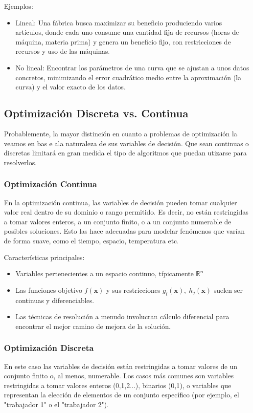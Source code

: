\documentclass[12pt,a4paper]{book}
\begin{document}
Ejemplos:
\begin{itemize}
    \item Lineal: Una fábrica busca maximizar su beneficio produciendo varios artículos, donde cada uno consume una cantidad fija de recursos (horas de máquina, materia prima) y genera un beneficio fijo, con restricciones de recursos y uso de las máquinas.
    \item No lineal: Encontrar los parámetros de una curva que se ajustan a unos datos concretos, minimizando el error cuadrático medio entre la aproximación (la curva) y el valor exacto de los datos.
\end{itemize}

\subsection{Optimización Discreta vs. Continua}
Probablemente, la mayor distinción en cuanto a problemas de optimización la veamos en bas e ala naturaleza de sus variables de decisión. Que sean continuas o discretas
limitará en gran medida el tipo de algoritmos que puedan utizarse para resolverlos.

\subsubsection{Optimización Continua}
En la optimización continua, las variables de decisión pueden tomar cualquier valor real dentro de su dominio o rango permitido. Es decir, no están restringidas a tomar valores enteros, a un conjunto finito, o a un conjunto numerable de posibles soluciones. Esto las hace adecuadas para modelar fenómenos que varían de forma suave, como el tiempo, espacio, temperatura etc.

Características principales:
\begin{itemize}
    \item Variables pertenecientes a un espacio continuo, típicamente $\mathbb{R}^n$
    \item Las funciones objetivo $f(\mathbf{x})$ y sus restricciones $g_i(\mathbf{x}), \;h_j(\mathbf{x})$ suelen ser continuas y diferenciables.
    \item Las técnicas de resolución a menudo involucran cálculo diferencial para encontrar el mejor camino de mejora de la solución.
\end{itemize}

\subsubsection{Optimización Discreta}
En este caso las variables de decisión están restringidas a tomar valores de un conjunto finito o, al menos, numerable. Los casos más comunes son variables restringidas a tomar valores enteros (0,1,2...), binarios (0,1), o variables que representan la elección de elementos de un conjunto específico (por ejemplo, el "trabajador 1" o el "trabajador 2").
\end{document}
